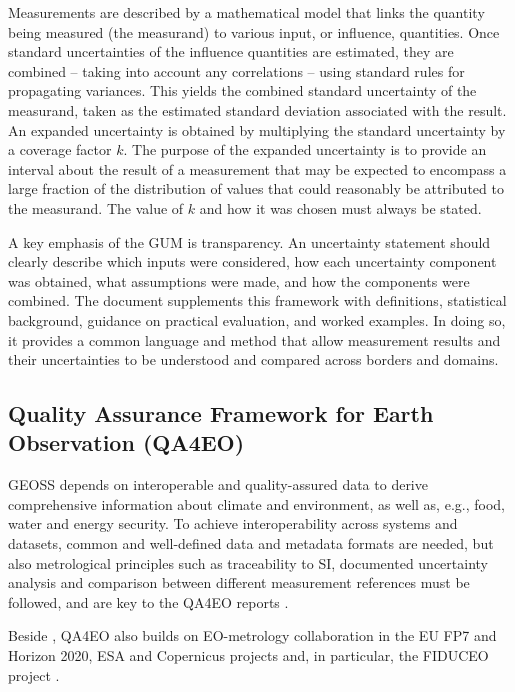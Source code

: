 Measurements are described by a mathematical model that links the quantity
being measured (the \gls{measurand}) to various input, or influence,
quantities. Once standard uncertainties of the influence quantities are
estimated, they are combined -- taking into account any correlations -- using
standard rules for propagating variances. This yields the combined standard
uncertainty of the \gls{measurand}, taken as the estimated standard deviation
associated with the result. An expanded uncertainty is obtained by multiplying
the standard uncertainty by a coverage factor $k$. The purpose of the expanded
uncertainty is  to provide an interval about the result of a measurement that
may be expected to encompass a large fraction of the distribution of values
that could reasonably be attributed to the \gls{measurand}. The value of $k$
and how it was chosen must always be stated.

A key emphasis of the \ac{GUM} is transparency. An uncertainty statement should
clearly describe which inputs were considered, how each uncertainty component
was obtained, what assumptions were made, and how the components were combined.
The document supplements this framework with definitions, statistical
background, guidance on practical evaluation, and worked examples. In doing so,
it provides a common language and method that allow measurement results and
their uncertainties to be understood and compared across borders and domains.

\subsection{Quality Assurance Framework for Earth Observation (QA4EO)}

\ac{GEOSS} depends on \gls{interoperable} and quality-assured data to derive
comprehensive information about climate and environment, as well as, e.g.,
food, water and energy security. To achieve \gls{interoperability} across
systems and datasets, common and well-defined data and metadata formats are
needed, but also metrological principles such as \gls{traceability} to \ac{SI},
documented \gls{uncertainty analysis} and \gls{comparison} between different
measurement references must be followed, and are key to the \ac{QA4EO} reports
\cite{QA4EO1}.

Beside \cite{JCGMVIM,JCGMGUM}, \ac{QA4EO} also builds on \ac{EO}-metrology
collaboration in the \ac{EU} \ac{FP7} and Horizon 2020, \ac{ESA} and Copernicus
projects and, in particular, the FIDUCEO project \cite{mittaz19}.

